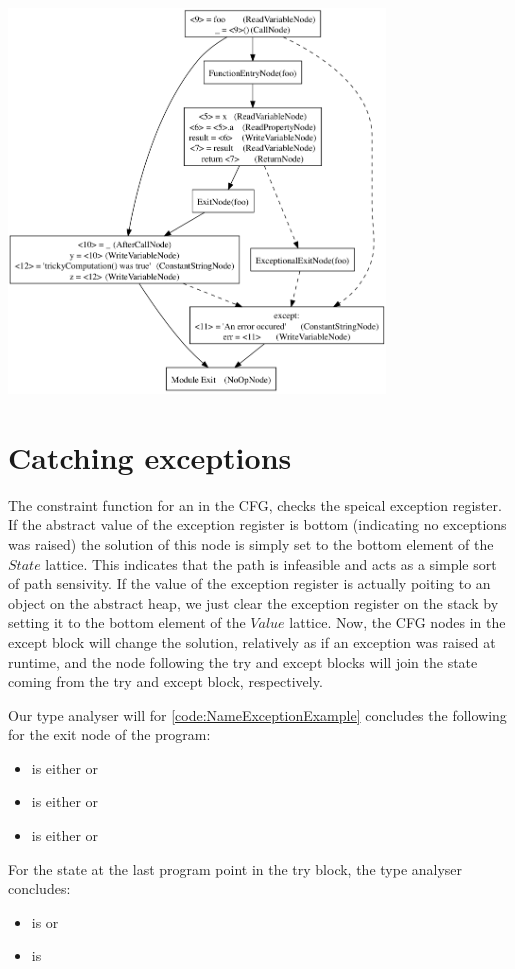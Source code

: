 \begin{listing}[H]
	\begin{center}
		\includegraphics[width=0.75\textwidth]{images/exception1.png}
	\end{center}
	\vspace{-10pt}
\end{listing}


\section{Catching exceptions}
The constraint function for an  in the CFG, checks the speical exception register. If the abstract value of the exception register is bottom (indicating no exceptions was raised) the solution of this node is simply set to the bottom element of the $State$ lattice. This indicates that the path is infeasible and acts as a simple sort of path sensivity. If the value of the exception register is actually poiting to an object on the abstract heap, we just clear the exception register on the stack by setting it to the bottom element of the $Value$ lattice. Now, the CFG nodes in the except block will change the solution, relatively as if an exception was raised at runtime, and the node following the try and except blocks will join the state coming from the try and except block, respectively.

Our type analyser will for \autoref{code:NameExceptionExample} concludes the following for the exit node of the program:

\begin{itemize}
	\item {} is either  or 
	\item {} is either  or 
	\item {} is either  or 
\end{itemize}

For the state at the last program point in the try block, the type analyser concludes:

\begin{itemize}
	\item {} is  or 
	\item {} is 
\end{itemize}
